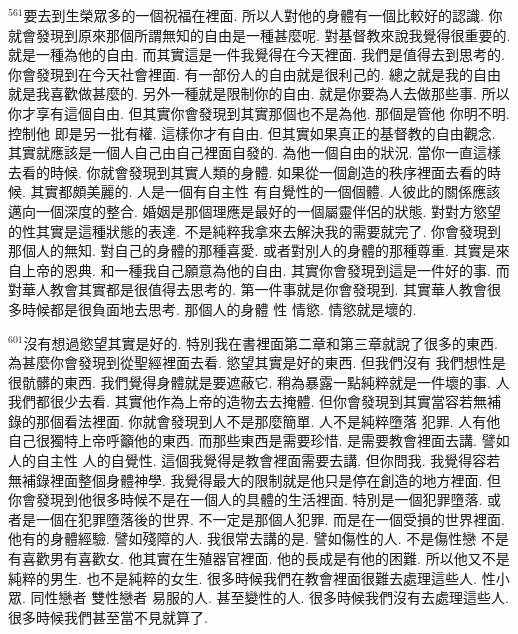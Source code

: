 \documentclass{book}
\begin{document}
$^{561}$要去到生榮眾多的一個祝福在裡面.
所以人對他的身體有一個比較好的認識.
你就會發現到原來那個所謂無知的自由是一種甚麼呢.
對基督教來說我覺得很重要的.
就是一種為他的自由.
而其實這是一件我覺得在今天裡面.
我們是值得去到思考的.
你會發現到在今天社會裡面.
有一部份人的自由就是很利己的.
總之就是我的自由就是我喜歡做甚麼的.
另外一種就是限制你的自由.
就是你要為人去做那些事.
所以你才享有這個自由.
但其實你會發現到其實那個也不是為他.
那個是管他 你明不明.
控制他 即是另一批有權.
這樣你才有自由.
但其實如果真正的基督教的自由觀念.
其實就應該是一個人自己由自己裡面自發的.
為他一個自由的狀況.
當你一直這樣去看的時候.
你就會發現到其實人類的身體.
如果從一個創造的秩序裡面去看的時候.
其實都頗美麗的.
人是一個有自主性 有自覺性的一個個體.
人彼此的關係應該邁向一個深度的整合.
婚姻是那個理應是最好的一個屬靈伴侶的狀態.
對對方慾望的性其實是這種狀態的表達.
不是純粹我拿來去解決我的需要就完了.
你會發現到那個人的無知.
對自己的身體的那種喜愛.
或者對別人的身體的那種尊重.
其實是來自上帝的恩典.
和一種我自己願意為他的自由.
其實你會發現到這是一件好的事.
而對華人教會其實都是很值得去思考的.
第一件事就是你會發現到.
其實華人教會很多時候都是很負面地去思考.
那個人的身體 性 情慾.
情慾就是壞的.

$^{601}$沒有想過慾望其實是好的.
特別我在書裡面第二章和第三章就說了很多的東西.
為甚麼你會發現到從聖經裡面去看.
慾望其實是好的東西.
但我們沒有 我們想性是很骯髒的東西.
我們覺得身體就是要遮蔽它.
稍為暴露一點純粹就是一件壞的事.
人我們都很少去看.
其實他作為上帝的造物去去掩體.
但你會發現到其實當容若無補錄的那個看法裡面.
你就會發現到人不是那麼簡單.
人不是純粹墮落 犯罪.
人有他自己很獨特上帝呼籲他的東西.
而那些東西是需要珍惜.
是需要教會裡面去講.
譬如人的自主性 人的自覺性.
這個我覺得是教會裡面需要去講.
但你問我.
我覺得容若無補錄裡面整個身體神學.
我覺得最大的限制就是他只是停在創造的地方裡面.
但你會發現到他很多時候不是在一個人的具體的生活裡面.
特別是一個犯罪墮落.
或者是一個在犯罪墮落後的世界.
不一定是那個人犯罪.
而是在一個受損的世界裡面.
他有的身體經驗.
譬如殘障的人.
我很常去講的是.
譬如傷性的人.
不是傷性戀 不是有喜歡男有喜歡女.
他其實在生殖器官裡面.
他的長成是有他的困難.
所以他又不是純粹的男生.
也不是純粹的女生.
很多時候我們在教會裡面很難去處理這些人.
性小眾.
同性戀者 雙性戀者 易服的人.
甚至變性的人.
很多時候我們沒有去處理這些人.
很多時候我們甚至當不見就算了.
\end{document}
